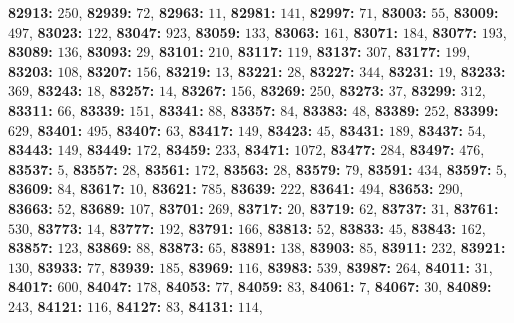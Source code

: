 \textsf{\bfseries 82913:} $250$, \textsf{\bfseries 82939:} $72$, \textsf{\bfseries 82963:} $11$, \textsf{\bfseries 82981:} $141$, \textsf{\bfseries 82997:} $71$, \textsf{\bfseries 83003:} $55$, \textsf{\bfseries 83009:} $497$, \textsf{\bfseries 83023:} $122$, \textsf{\bfseries 83047:} $923$, \textsf{\bfseries 83059:} $133$, \textsf{\bfseries 83063:} $161$, \textsf{\bfseries 83071:} $184$, \textsf{\bfseries 83077:} $193$, \textsf{\bfseries 83089:} $136$, \textsf{\bfseries 83093:} $29$, \textsf{\bfseries 83101:} $210$, \textsf{\bfseries 83117:} $119$, \textsf{\bfseries 83137:} $307$, \textsf{\bfseries 83177:} $199$, \textsf{\bfseries 83203:} $108$, \textsf{\bfseries 83207:} $156$, \textsf{\bfseries 83219:} $13$, \textsf{\bfseries 83221:} $28$, \textsf{\bfseries 83227:} $344$, \textsf{\bfseries 83231:} $19$, \textsf{\bfseries 83233:} $369$, \textsf{\bfseries 83243:} $18$, \textsf{\bfseries 83257:} $14$, \textsf{\bfseries 83267:} $156$, \textsf{\bfseries 83269:} $250$, \textsf{\bfseries 83273:} $37$, \textsf{\bfseries 83299:} $312$, \textsf{\bfseries 83311:} $66$, \textsf{\bfseries 83339:} $151$, \textsf{\bfseries 83341:} $88$, \textsf{\bfseries 83357:} $84$, \textsf{\bfseries 83383:} $48$, \textsf{\bfseries 83389:} $252$, \textsf{\bfseries 83399:} $629$, \textsf{\bfseries 83401:} $495$, \textsf{\bfseries 83407:} $63$, \textsf{\bfseries 83417:} $149$, \textsf{\bfseries 83423:} $45$, \textsf{\bfseries 83431:} $189$, \textsf{\bfseries 83437:} $54$, \textsf{\bfseries 83443:} $149$, \textsf{\bfseries 83449:} $172$, \textsf{\bfseries 83459:} $233$, \textsf{\bfseries 83471:} $1072$, \textsf{\bfseries 83477:} $284$, \textsf{\bfseries 83497:} $476$, \textsf{\bfseries 83537:} $5$, \textsf{\bfseries 83557:} $28$, \textsf{\bfseries 83561:} $172$, \textsf{\bfseries 83563:} $28$, \textsf{\bfseries 83579:} $79$, \textsf{\bfseries 83591:} $434$, \textsf{\bfseries 83597:} $5$, \textsf{\bfseries 83609:} $84$, \textsf{\bfseries 83617:} $10$, \textsf{\bfseries 83621:} $785$, \textsf{\bfseries 83639:} $222$, \textsf{\bfseries 83641:} $494$, \textsf{\bfseries 83653:} $290$, \textsf{\bfseries 83663:} $52$, \textsf{\bfseries 83689:} $107$, \textsf{\bfseries 83701:} $269$, \textsf{\bfseries 83717:} $20$, \textsf{\bfseries 83719:} $62$, \textsf{\bfseries 83737:} $31$, \textsf{\bfseries 83761:} $530$, \textsf{\bfseries 83773:} $14$, \textsf{\bfseries 83777:} $192$, \textsf{\bfseries 83791:} $166$, \textsf{\bfseries 83813:} $52$, \textsf{\bfseries 83833:} $45$, \textsf{\bfseries 83843:} $162$, \textsf{\bfseries 83857:} $123$, \textsf{\bfseries 83869:} $88$, \textsf{\bfseries 83873:} $65$, \textsf{\bfseries 83891:} $138$, \textsf{\bfseries 83903:} $85$, \textsf{\bfseries 83911:} $232$, \textsf{\bfseries 83921:} $130$, \textsf{\bfseries 83933:} $77$, \textsf{\bfseries 83939:} $185$, \textsf{\bfseries 83969:} $116$, \textsf{\bfseries 83983:} $539$, \textsf{\bfseries 83987:} $264$, \textsf{\bfseries 84011:} $31$, \textsf{\bfseries 84017:} $600$, \textsf{\bfseries 84047:} $178$, \textsf{\bfseries 84053:} $77$, \textsf{\bfseries 84059:} $83$, \textsf{\bfseries 84061:} $7$, \textsf{\bfseries 84067:} $30$, \textsf{\bfseries 84089:} $243$, \textsf{\bfseries 84121:} $116$, \textsf{\bfseries 84127:} $83$, \textsf{\bfseries 84131:} $114$, 
